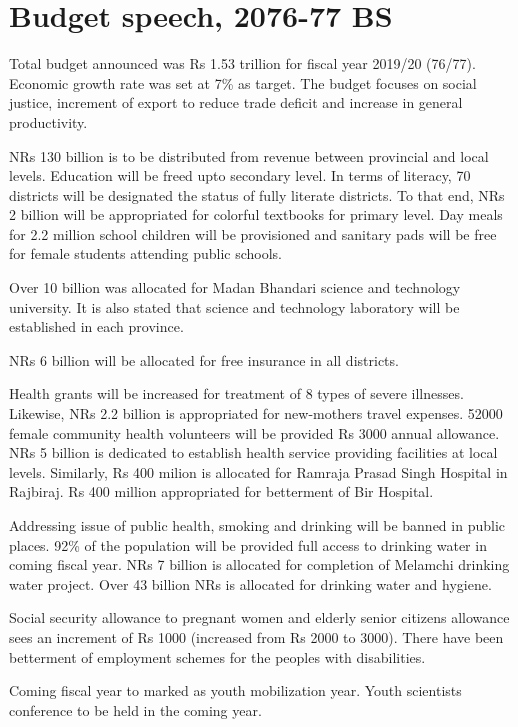 \documentclass[
  openany]{book}
\begin{document}
\hypertarget{budget-speech-2076-77-bs}{%
\section{Budget speech, 2076-77 BS}\label{budget-speech-2076-77-bs}}

Total budget announced was Rs 1.53 trillion for fiscal year 2019/20 (76/77). Economic growth rate was set at 7\% as target. The budget focuses on social justice, increment of export to reduce trade deficit and increase in general productivity.

NRs 130 billion is to be distributed from revenue between provincial and local levels. Education will be freed upto secondary level. In terms of literacy, 70 districts will be designated the status of fully literate districts. To that end, NRs 2 billion will be appropriated for colorful textbooks for primary level. Day meals for 2.2 million school children will be provisioned and sanitary pads will be free for female students attending public schools.

Over 10 billion was allocated for Madan Bhandari science and technology university. It is also stated that science and technology laboratory will be established in each province.

NRs 6 billion will be allocated for free insurance in all districts.

Health grants will be increased for treatment of 8 types of severe illnesses. Likewise, NRs 2.2 billion is appropriated for new-mothers travel expenses. 52000 female community health volunteers will be provided Rs 3000 annual allowance. NRs 5 billion is dedicated to establish health service providing facilities at local levels. Similarly, Rs 400 milion is allocated for Ramraja Prasad Singh Hospital in Rajbiraj. Rs 400 million appropriated for betterment of Bir Hospital.

Addressing issue of public health, smoking and drinking will be banned in public places. 92\% of the population will be provided full access to drinking water in coming fiscal year. NRs 7 billion is allocated for completion of Melamchi drinking water project. Over 43 billion NRs is allocated for drinking water and hygiene.

Social security allowance to pregnant women and elderly senior citizens allowance sees an increment of Rs 1000 (increased from Rs 2000 to 3000). There have been betterment of employment schemes for the peoples with disabilities.

Coming fiscal year to marked as youth mobilization year. Youth scientists conference to be held in the coming year.
\end{document}
